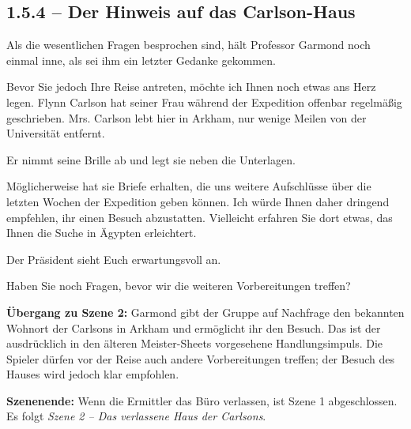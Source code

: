 \subsection{1.5.4 -- Der Hinweis auf das Carlson-Haus}
\begin{vorlesetextalle}
Als die wesentlichen Fragen besprochen sind, hält Professor Garmond noch einmal inne, als sei ihm ein letzter Gedanke gekommen.

\glqq{}Bevor Sie jedoch Ihre Reise antreten, möchte ich Ihnen noch etwas ans Herz legen. Flynn Carlson hat seiner Frau während der Expedition offenbar regelmä\ss{}ig geschrieben. Mrs. Carlson lebt hier in Arkham, nur wenige Meilen von der Universität entfernt.\grqq{}

Er nimmt seine Brille ab und legt sie neben die Unterlagen.

\glqq{}Möglicherweise hat sie Briefe erhalten, die uns weitere Aufschlüsse über die letzten Wochen der Expedition geben können. Ich würde Ihnen daher dringend empfehlen, ihr einen Besuch abzustatten. Vielleicht erfahren Sie dort etwas, das Ihnen die Suche in Ägypten erleichtert.\grqq{}

Der Präsident sieht Euch erwartungsvoll an.

\glqq{}Haben Sie noch Fragen, bevor wir die weiteren Vorbereitungen treffen?\grqq{}
\end{vorlesetextalle}

\begin{meisterinfo}
\textbf{Übergang zu Szene 2:} Garmond gibt der Gruppe auf Nachfrage den bekannten Wohnort der Carlsons in Arkham und ermöglicht ihr den Besuch. Das ist der ausdrücklich in den älteren Meister-Sheets vorgesehene Handlungsimpuls. Die Spieler dürfen vor der Reise auch andere Vorbereitungen treffen; der Besuch des Hauses wird jedoch klar empfohlen.

\textbf{Szenenende:} Wenn die Ermittler das Büro verlassen, ist Szene 1 abgeschlossen. Es folgt \emph{Szene 2 -- Das verlassene Haus der Carlsons}.
\end{meisterinfo}

